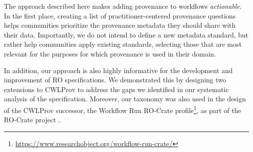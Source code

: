 The approach described here makes adding provenance to workflows \emph{actionable}. In the first place, creating a list of practitioner-centered provenance questions helps communities prioritize the provenance metadata they should share with their data. Importantly, we do not intend to define a new metadata standard, but rather help communities apply existing standards, selecting those that are most relevant for the purposes for which provenance is used in their domain. 






In addition, 
our approach is also highly informative for the development and improvement of RO specifications. We demonstrated this by designing two extensions to CWLProv to address the gaps we identified in our systematic analysis of the specification. Moreover, our taxonomy was also used in the design of the CWLProv successor, the Workflow Run RO-Crate profile\footnote{\url{https://www.researchobject.org/workflow-run-crate/}}, as part of the RO-Crate project \cite{SoilandReyes2022a}.

